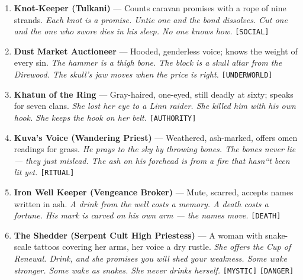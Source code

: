 {{\begin{enumerate}
\item {} \textbf{Knot-Keeper (Tulkani)} --- Counts caravan promises with a rope of nine strands. \hfill \textit{Each knot is a promise. Untie one and the bond dissolves. Cut one and the one who swore dies in his sleep. No one knows how.} \texttt{[SOCIAL]}
\item {} \textbf{Dust Market Auctioneer} --- Hooded, genderless voice; knows the weight of every sin. \hfill \textit{The hammer is a thigh bone. The block is a skull altar from the Direwood. The skull's jaw moves when the price is right.} \texttt{[UNDERWORLD]}
\item {} \textbf{Khatun of the Ring} --- Gray-haired, one-eyed, still deadly at sixty; speaks for seven clans. \hfill \textit{She lost her eye to a Linn raider. She killed him with his own hook. She keeps the hook on her belt.} \texttt{[AUTHORITY]}
\item {} \textbf{Kuva's Voice (Wandering Priest)} --- Weathered, ash-marked, offers omen readings for grass. \hfill \textit{He prays to the sky by throwing bones. The bones never lie --- they just mislead. The ash on his forehead is from a fire that hasn``t been lit yet.} \texttt{[RITUAL]}
\item {} \textbf{Iron Well Keeper (Vengeance Broker)} --- Mute, scarred, accepts names written in ash. \hfill \textit{A drink from the well costs a memory. A death costs a fortune. His mark is carved on his own arm --- the names move.} \texttt{[DEATH]}
\item {} \textbf{The Shedder (Serpent Cult High Priestess)} --- A woman with snake-scale tattoos covering her arms, her voice a dry rustle. \hfill \textit{She offers the Cup of Renewal. Drink, and she promises you will shed your weakness. Some wake stronger. Some wake as snakes. She never drinks herself.} \texttt{[MYSTIC]} \texttt{[DANGER]}
\end{enumerate}

}}
